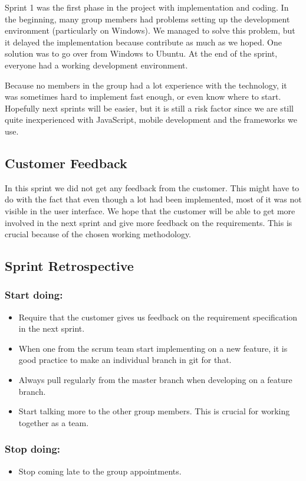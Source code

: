 	Sprint 1 was the first phase in the project with implementation and coding. In the beginning, 
	many group members had problems setting up the development environment (particularly on Windows). 
	We managed to solve this problem, but it delayed the implementation because contribute as much as we hoped. 
	One solution was to go over from Windows to Ubuntu. At the end of the sprint, everyone had a working development environment.

	Because no members in the group had a lot experience with the technology, it was sometimes hard
	to implement fast enough, or even know where to start. Hopefully next sprints will be easier, 
	but it is still a risk factor since we are still quite inexperienced with JavaScript, mobile development and the frameworks we use. 

\subsection{Customer Feedback}
	In this sprint we did not get any feedback from the customer. This might have to do with the 
	fact that even though a lot had been implemented, most of it was not visible in the user interface. 
	We hope that the customer will be able to get more involved in the next sprint and give more feedback 
	on the requirements. This is crucial because of the chosen working methodology.

\subsection{Sprint Retrospective}
	\subsubsection*{Start doing: } 
		\begin{itemize}
			\item Require that the customer gives us feedback on the
			requirement specification in the next sprint.
			\item When one from the scrum team start implementing on a new feature, 
			it is good practice to make an individual branch in git for that. 
			\item Always pull regularly from the master branch when developing
			on a feature branch.
			\item Start talking more to the other group members. This is crucial 
			for working together as a team.
		\end{itemize}
	\subsubsection*{Stop doing: } 
		\begin{itemize}
			\item Stop coming late to the group appointments.
		\end{itemize} 
